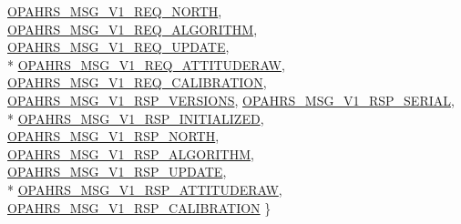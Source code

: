 \begin{DoxyCompactItemize}
\hyperlink{group___p_i_o_s___o_p_a_h_r_s_gga83fcba837e9aa83c34680ef159f5dec7a41cf786ee44b83d591cec38d97d2d2c1}{O\-P\-A\-H\-R\-S\-\_\-\-M\-S\-G\-\_\-\-V1\-\_\-\-R\-E\-Q\-\_\-\-N\-O\-R\-T\-H}, 
\hyperlink{group___p_i_o_s___o_p_a_h_r_s_gga83fcba837e9aa83c34680ef159f5dec7a0c72873fd5feff6819841a778344a923}{O\-P\-A\-H\-R\-S\-\_\-\-M\-S\-G\-\_\-\-V1\-\_\-\-R\-E\-Q\-\_\-\-A\-L\-G\-O\-R\-I\-T\-H\-M}, 
\hyperlink{group___p_i_o_s___o_p_a_h_r_s_gga83fcba837e9aa83c34680ef159f5dec7aac2a1b2165a9c27bb119be281967b658}{O\-P\-A\-H\-R\-S\-\_\-\-M\-S\-G\-\_\-\-V1\-\_\-\-R\-E\-Q\-\_\-\-U\-P\-D\-A\-T\-E}, 
\\*
\hyperlink{group___p_i_o_s___o_p_a_h_r_s_gga83fcba837e9aa83c34680ef159f5dec7a901abc484704dc51e90c08713a252ed2}{O\-P\-A\-H\-R\-S\-\_\-\-M\-S\-G\-\_\-\-V1\-\_\-\-R\-E\-Q\-\_\-\-A\-T\-T\-I\-T\-U\-D\-E\-R\-A\-W}, 
\hyperlink{group___p_i_o_s___o_p_a_h_r_s_gga83fcba837e9aa83c34680ef159f5dec7a32bd29251846fef2896d4aab7409a753}{O\-P\-A\-H\-R\-S\-\_\-\-M\-S\-G\-\_\-\-V1\-\_\-\-R\-E\-Q\-\_\-\-C\-A\-L\-I\-B\-R\-A\-T\-I\-O\-N}, 
\hyperlink{group___p_i_o_s___o_p_a_h_r_s_gga83fcba837e9aa83c34680ef159f5dec7a408a8e8263dbee0b2be7f005f58d6006}{O\-P\-A\-H\-R\-S\-\_\-\-M\-S\-G\-\_\-\-V1\-\_\-\-R\-S\-P\-\_\-\-V\-E\-R\-S\-I\-O\-N\-S}, 
\hyperlink{group___p_i_o_s___o_p_a_h_r_s_gga83fcba837e9aa83c34680ef159f5dec7a9f3c615785873882facb06adc8f09795}{O\-P\-A\-H\-R\-S\-\_\-\-M\-S\-G\-\_\-\-V1\-\_\-\-R\-S\-P\-\_\-\-S\-E\-R\-I\-A\-L}, 
\\*
\hyperlink{group___p_i_o_s___o_p_a_h_r_s_gga83fcba837e9aa83c34680ef159f5dec7a4bc7e0383bdff92c886683a6d6f16ff1}{O\-P\-A\-H\-R\-S\-\_\-\-M\-S\-G\-\_\-\-V1\-\_\-\-R\-S\-P\-\_\-\-I\-N\-I\-T\-I\-A\-L\-I\-Z\-E\-D}, 
\hyperlink{group___p_i_o_s___o_p_a_h_r_s_gga83fcba837e9aa83c34680ef159f5dec7a9ce7ceb2664fc753ed2ac55d8b1fb2fd}{O\-P\-A\-H\-R\-S\-\_\-\-M\-S\-G\-\_\-\-V1\-\_\-\-R\-S\-P\-\_\-\-N\-O\-R\-T\-H}, 
\hyperlink{group___p_i_o_s___o_p_a_h_r_s_gga83fcba837e9aa83c34680ef159f5dec7a30376a6103f39d069e4d14e1847cde0e}{O\-P\-A\-H\-R\-S\-\_\-\-M\-S\-G\-\_\-\-V1\-\_\-\-R\-S\-P\-\_\-\-A\-L\-G\-O\-R\-I\-T\-H\-M}, 
\hyperlink{group___p_i_o_s___o_p_a_h_r_s_gga83fcba837e9aa83c34680ef159f5dec7a5ecbe65b1cadb92520fa23bb3327ee74}{O\-P\-A\-H\-R\-S\-\_\-\-M\-S\-G\-\_\-\-V1\-\_\-\-R\-S\-P\-\_\-\-U\-P\-D\-A\-T\-E}, 
\\*
\hyperlink{group___p_i_o_s___o_p_a_h_r_s_gga83fcba837e9aa83c34680ef159f5dec7aac5f18b88ab965f6566785346009d39b}{O\-P\-A\-H\-R\-S\-\_\-\-M\-S\-G\-\_\-\-V1\-\_\-\-R\-S\-P\-\_\-\-A\-T\-T\-I\-T\-U\-D\-E\-R\-A\-W}, 
\hyperlink{group___p_i_o_s___o_p_a_h_r_s_gga83fcba837e9aa83c34680ef159f5dec7afd5be303fb0035e8b2d6df07cfdded34}{O\-P\-A\-H\-R\-S\-\_\-\-M\-S\-G\-\_\-\-V1\-\_\-\-R\-S\-P\-\_\-\-C\-A\-L\-I\-B\-R\-A\-T\-I\-O\-N}
 \}
\end{DoxyCompactItemize}
